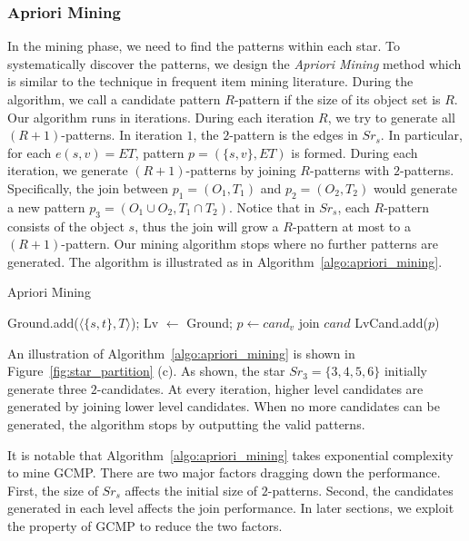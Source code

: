 \subsubsection{Apriori Mining}
In the mining phase, we need to find the patterns within each star. 
To systematically discover the patterns, we design the \emph{Apriori Mining} method which
is similar to the technique in frequent item mining literature. During the algorithm, we call a candidate pattern $R$-pattern if the size of its object set is $R$. 
Our algorithm runs in iterations. During each iteration $R$, we try to generate all $(R+1)$-patterns. In iteration $1$, the $2$-pattern is the edges in $Sr_s$. In particular,
for each $e(s,v)=ET$, pattern $p=(\{s,v\}, ET)$ is formed. During each iteration, 
we generate $(R+1)$-patterns by joining $R$-patterns with $2$-patterns. Specifically,
the join between $p_1=(O_1, T_1)$ and $p_2=(O_2, T_2)$ would generate a new pattern $p_3=(O_1 \cup O_2, T_1 \cap T_2)$. Notice that in $Sr_s$, each $R$-pattern consists of the object $s$, thus the join will grow a $R$-pattern at most to a $(R+1)$-pattern.
Our mining algorithm stops where no further patterns are generated. The algorithm is illustrated as in Algorithm~\ref{algo:apriori_mining}.

\begin{algorithm}
\caption{Apriori Mining}
\label{algo:apriori_mining}
\begin{algorithmic}[1]
\State Ground.add($\langle \{s,t\}, T \rangle$);
\State Lv $\gets$ Ground;
\EndFor
{}
				\State $p \gets cand_v$ join $cand$
					\State LvCand.add($p$)
				\EndIf
			\EndFor
		\EndFor
	\Else
	\EndIf
\EndWhile
\end{algorithmic}
\end{algorithm}

An illustration of Algorithm~\ref{algo:apriori_mining} is shown in Figure~\ref{fig:star_partition} (c).
As shown, the star $Sr_3=\{3,4,5,6\}$ initially generate three $2$-candidates. At every iteration, 
higher level candidates are generated by joining lower level candidates. When no more candidates 
can be generated, the algorithm stops by outputting the valid patterns.

It is notable that Algorithm~\ref{algo:apriori_mining} takes exponential complexity to mine GCMP. There
are two major factors dragging down the performance. First, the size of $Sr_s$ affects
the initial size of $2$-patterns. Second, the candidates generated in each level affects the join performance. In later
sections, we exploit the property of GCMP to reduce the two factors.
